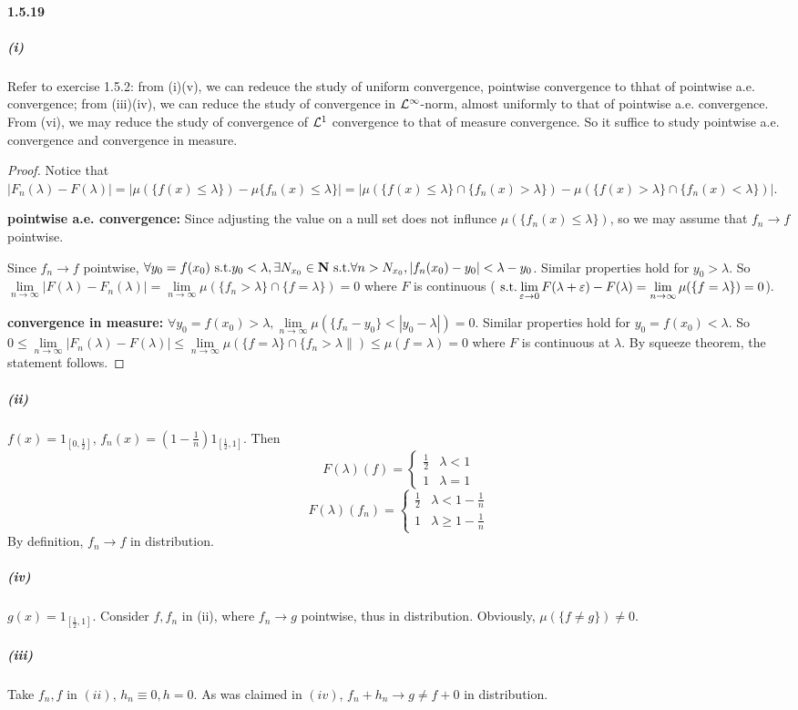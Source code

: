 \documentclass{article}
\begin{document}
\paragraph{1.5.19}
\subparagraph{(i)}
Refer to exercise 1.5.2: from (i)(v), we can redeuce the study of uniform convergence, pointwise convergence to thhat of pointwise a.e. convergence; from (iii)(iv), we can reduce the study of convergence in $\mathcal{L}^{\infty}$-norm, almost uniformly to that of pointwise a.e. convergence. From (vi), we may reduce the study of convergence of $\mathcal{L}^1$ convergence to that of measure convergence. So it suffice to study pointwise a.e. convergence and 
convergence in measure.
\begin{proof}
Notice that $|F_n(\lambda)-F(\lambda)|=|\mu(\{f(x)\leq\lambda\})-\mu\{f_n(x)\leq\lambda\}|=|\mu(\{f(x)\leq\lambda\}\cap\{f_n(x)>\lambda\})-\mu(\{f(x)>\lambda\}\cap\{f_n(x)<\lambda\})|$.

\textbf{pointwise a.e. convergence:} Since adjusting the value on a null set does not influnce $\mu(\{f_n(x)\leq\lambda\})$, so we may assume that $f_n\to f$ pointwise.

Since $f_n\to f$ pointwise, $\forall y_0=f(x_0)\text{ s.t.} y_0<\lambda, \exists N_{x_0}\in \mathbf{N}\text{ s.t.} \forall n>N_{x_0}, |f_n(x_0)-y_0|<\lambda-y_0$. Similar properties hold for $y_0>\lambda$. So  $\lim\limits_{n\to\infty}|F(\lambda)-F_n(\lambda)|=\lim\limits_{n\to\infty}\mu(\{f_n>\lambda\}\cap\{f=\lambda\})=0$ where $F$ is continuous ($\text{ s.t.} \lim\limits_{\varepsilon\to 0}F(\lambda+\varepsilon)-F(\lambda)=\lim\limits_{n\to\infty}\mu(\{f=\lambda\})=0$).

\textbf{convergence in measure:} $\forall y_0=f(x_0)>\lambda, \lim\limits_{n\to\infty}\mu(\{f_n-y_0\}<|y_0-\lambda|)=0$. Similar properties hold for $y_0=f(x_0)<\lambda$. So $0\leq\lim\limits_{n\to\infty}|F_n(\lambda)-F(\lambda)|\leq\lim\limits_{n\to\infty}\mu(\{f=\lambda\}\cap\{f_n>\lambda\|)\leq\mu(f=\lambda)=0$ where $F$ is continuous at $\lambda$. By squeeze theorem, the statement follows.
\end{proof}
\subparagraph{(ii)}
$f(x)=1_{[0,\frac{1}{2}]}$, $f_n(x)=(1-\frac 1 n)1_{[\frac 1 2,1]}$. Then 
\[F(\lambda)(f)=\begin{cases} \frac 1 2 &\lambda<1\\1&\lambda=1\end{cases}\]
\[F(\lambda)(f_n)=\begin{cases} \frac 1 2 &\lambda<1-\frac 1 n\\1&\lambda\geq 1-\frac 1 n\end{cases}\]
By definition, $f_n\to f$ in distribution.
\subparagraph{(iv)}
$g(x)=1_{[\frac 1 2,1]}$. Consider $f,f_n$ in (ii), where $f_n\to g$ pointwise, thus in distribution. Obviously, $\mu(\{f\neq g\})\neq 0$.
\subparagraph{(iii)}
Take $f_n, f$ in $(ii)$, $h_n\equiv 0, h=0$. As was claimed in $(iv)$, $f_n+h_n\to g\neq f+0$ in distribution.
\end{document}

